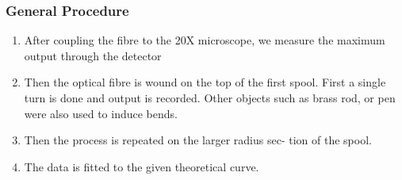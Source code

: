 \documentclass[%
 reprint,
nofootinbib,
 amsmath,amssymb,
 aps,
]{revtex4-2}
\begin{document}
\subsubsection*{\textbf{General Procedure}}
\begin{enumerate}
	\item After coupling the fibre to the 20X microscope, we
	measure the maximum output through the detector
	\item Then the optical fibre is wound on the top of the
	first spool. First a single turn is done and output is
	recorded. Other objects such as brass rod, or pen were
	also used to induce bends.
	\item Then the process is repeated on the larger radius sec-
	tion of the spool.
	\item The data is fitted to the given theoretical curve.
\end{enumerate}
\end{document}
